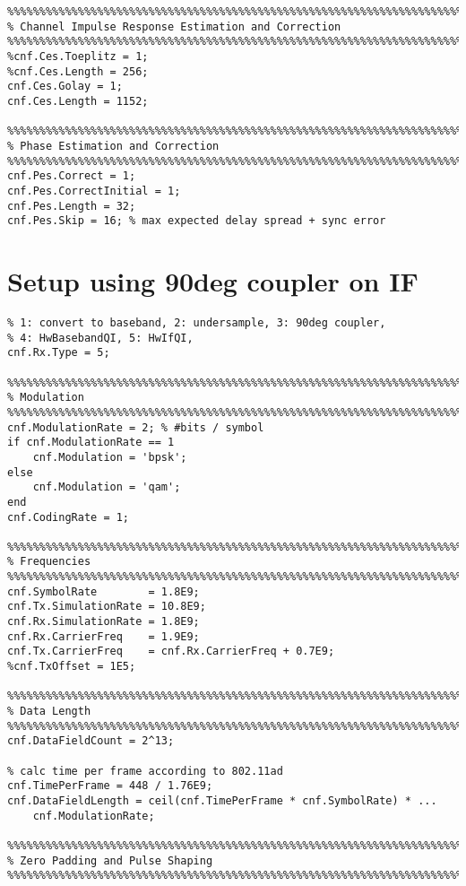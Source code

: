 \begin{appendix}
\begin{verbatim}
%%%%%%%%%%%%%%%%%%%%%%%%%%%%%%%%%%%%%%%%%%%%%%%%%%%%%%%%%%%%%%%%%%%%%%%%%%%%%%%%
% Channel Impulse Response Estimation and Correction
%%%%%%%%%%%%%%%%%%%%%%%%%%%%%%%%%%%%%%%%%%%%%%%%%%%%%%%%%%%%%%%%%%%%%%%%%%%%%%%%
%cnf.Ces.Toeplitz = 1;
%cnf.Ces.Length = 256;
cnf.Ces.Golay = 1;
cnf.Ces.Length = 1152;

%%%%%%%%%%%%%%%%%%%%%%%%%%%%%%%%%%%%%%%%%%%%%%%%%%%%%%%%%%%%%%%%%%%%%%%%%%%%%%%%
% Phase Estimation and Correction
%%%%%%%%%%%%%%%%%%%%%%%%%%%%%%%%%%%%%%%%%%%%%%%%%%%%%%%%%%%%%%%%%%%%%%%%%%%%%%%%
cnf.Pes.Correct = 1;
cnf.Pes.CorrectInitial = 1;
cnf.Pes.Length = 32;
cnf.Pes.Skip = 16; % max expected delay spread + sync error
\end{verbatim}


\section{Setup using 90deg coupler on IF}
\begin{verbatim}
% 1: convert to baseband, 2: undersample, 3: 90deg coupler,
% 4: HwBasebandQI, 5: HwIfQI,
cnf.Rx.Type = 5;

%%%%%%%%%%%%%%%%%%%%%%%%%%%%%%%%%%%%%%%%%%%%%%%%%%%%%%%%%%%%%%%%%%%%%%%%%%%%%%%%
% Modulation
%%%%%%%%%%%%%%%%%%%%%%%%%%%%%%%%%%%%%%%%%%%%%%%%%%%%%%%%%%%%%%%%%%%%%%%%%%%%%%%%
cnf.ModulationRate = 2; % #bits / symbol
if cnf.ModulationRate == 1
    cnf.Modulation = 'bpsk';
else
    cnf.Modulation = 'qam';
end
cnf.CodingRate = 1;

%%%%%%%%%%%%%%%%%%%%%%%%%%%%%%%%%%%%%%%%%%%%%%%%%%%%%%%%%%%%%%%%%%%%%%%%%%%%%%%%
% Frequencies
%%%%%%%%%%%%%%%%%%%%%%%%%%%%%%%%%%%%%%%%%%%%%%%%%%%%%%%%%%%%%%%%%%%%%%%%%%%%%%%%
cnf.SymbolRate        = 1.8E9;
cnf.Tx.SimulationRate = 10.8E9;
cnf.Rx.SimulationRate = 1.8E9;
cnf.Rx.CarrierFreq    = 1.9E9;
cnf.Tx.CarrierFreq    = cnf.Rx.CarrierFreq + 0.7E9;
%cnf.TxOffset = 1E5;

%%%%%%%%%%%%%%%%%%%%%%%%%%%%%%%%%%%%%%%%%%%%%%%%%%%%%%%%%%%%%%%%%%%%%%%%%%%%%%%%
% Data Length
%%%%%%%%%%%%%%%%%%%%%%%%%%%%%%%%%%%%%%%%%%%%%%%%%%%%%%%%%%%%%%%%%%%%%%%%%%%%%%%%
cnf.DataFieldCount = 2^13;

% calc time per frame according to 802.11ad
cnf.TimePerFrame = 448 / 1.76E9;
cnf.DataFieldLength = ceil(cnf.TimePerFrame * cnf.SymbolRate) * ...
    cnf.ModulationRate;

%%%%%%%%%%%%%%%%%%%%%%%%%%%%%%%%%%%%%%%%%%%%%%%%%%%%%%%%%%%%%%%%%%%%%%%%%%%%%%%%
% Zero Padding and Pulse Shaping
%%%%%%%%%%%%%%%%%%%%%%%%%%%%%%%%%%%%%%%%%%%%%%%%%%%%%%%%%%%%%%%%%%%%%%%%%%%%%%%%


\end{verbatim}
\end{appendix}
